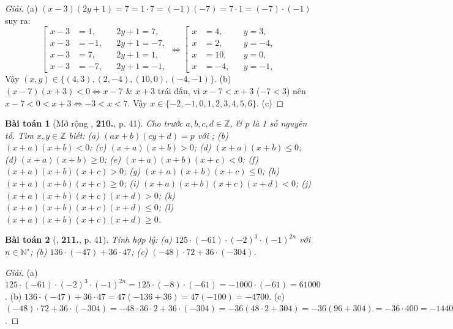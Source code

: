 \documentclass{article}
\numberwithin{equation}{section}
\newtheorem{baitoan}{Bài toán}
\begin{document}
\begin{proof}[Giải]
	(a) $(x - 3)(2y + 1) = 7 = 1\cdot 7 = (-1)(-7) = 7\cdot 1 = (-7)\cdot(-1)$ suy ra:
	\begin{equation*}
		\left[\begin{split}
			x - 3 &= 1,&&2y + 1 = 7,\\
			x - 3 &= -1,&&2y + 1 = -7,\\
			x - 3 &= 7,&&2y + 1 = 1,\\
			x - 3 &= -7,&&2y + 1 = -1,
		\end{split}\right.\Leftrightarrow
		\left[\begin{split}
			x &= 4,&&y = 3,\\
			x &= 2,&&y = -4,\\
			x &= 10,&&y = 0,\\
			x &= -4,&&y = -1,
		\end{split}\right.
	\end{equation*}
	Vậy $(x,y)\in\{(4,3),(2,-4),(10,0),(-4,-1)\}$. (b) $(x - 7)(x + 3) < 0\Leftrightarrow x - 7$ \& $x + 3$ trái dấu, vì $x - 7 < x + 3$ ($-7 < 3$) nên $x - 7< 0 < x + 3\Leftrightarrow-3 < x < 7$. Vậy $x\in\{-2,-1,0,1,2,3,4,5,6\}$. (c) 
\end{proof}

\begin{baitoan}[Mở rộng \cite{Tuyen_Toan_6}, \textbf{210.}, p. 41]
	Cho trước $a,b,c,d\in\mathbb{Z}$, \& $p$ là 1 số nguyên tố. Tìm $x,y\in\mathbb{Z}$ biết: (a) $(ax + b)(cy + d) = p$ với ; (b) $(x + a)(x + b) < 0$; (c) $(x + a)(x + b) > 0$; (d) $(x + a)(x + b)\le0$; (d) $(x + a)(x + b)\ge0$; (e) $(x + a)(x + b)(x + c) < 0$; (f) $(x + a)(x + b)(x + c) > 0$; (g) $(x + a)(x + b)(x + c)\le0$; (h) $(x + a)(x + b)(x + c)\ge0$; (i) $(x + a)(x + b)(x + c)(x + d) < 0$; (j) $(x + a)(x + b)(x + c)(x + d) > 0$; (k) $(x + a)(x + b)(x + c)(x + d)\le0$; (l) $(x + a)(x + b)(x + c)(x + d)\ge0$.
\end{baitoan}

\begin{baitoan}[\cite{Tuyen_Toan_6}, \textbf{211.}, p. 41]
	Tính hợp lý: (a) $125\cdot(-61)\cdot(-2)^3\cdot(-1)^{2n}$ với $n\in\mathbb{N}^\star$; (b) $136\cdot(-47) + 36\cdot47$; (c) $(-48)\cdot72 + 36\cdot(-304)$.
\end{baitoan}

\begin{proof}[Giải]
	(a) $125\cdot(-61)\cdot(-2)^3\cdot(-1)^{2n}= 125\cdot(-8)\cdot(-61) = -1000\cdot(-61) = 61000$. (b) $136\cdot(-47) + 36\cdot47 = 47(-136 + 36) = 47(-100) = -4700$. (c) $(-48)\cdot72 + 36\cdot(-304) = -48\cdot36\cdot2 + 36\cdot(-304) = -36(48\cdot2 + 304) = -36(96 + 304) = -36\cdot400 = -14400$.
\end{proof}
\end{document}
